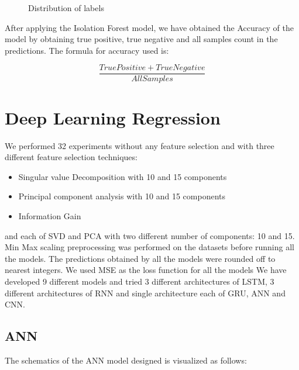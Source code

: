 \begin{figure}
%
  \caption{Distribution of labels}
  \label{fig:key}
\end{figure}

After applying the Isolation Forest model, we have obtained the Accuracy of the model by obtaining true positive, true negative and all samples count in the predictions. The formula for accuracy used is:

\[\frac{True Positive + True Negative}{All Samples}\] 

\section{Deep Learning Regression}
We performed 32 experiments without any feature selection and with three different feature selection techniques:
 \begin{itemize}
     \item Singular value Decomposition with 10 and 15 components
     \item Principal component analysis with 10 and 15 components
     \item Information Gain
 \end{itemize}
and each of SVD and PCA with two different number of components: 10 and 15.
Min Max scaling preprocessing was performed on the datasets before running all the models. The predictions obtained by all the models were rounded off to nearest integers. We used MSE as the loss function for all the models
We have developed 9 different models and tried 3 different architectures of LSTM, 3 different architectures of RNN and single architecture each of GRU, ANN and CNN.

\subsection{ANN}
The schematics of the ANN model designed is visualized as follows:

